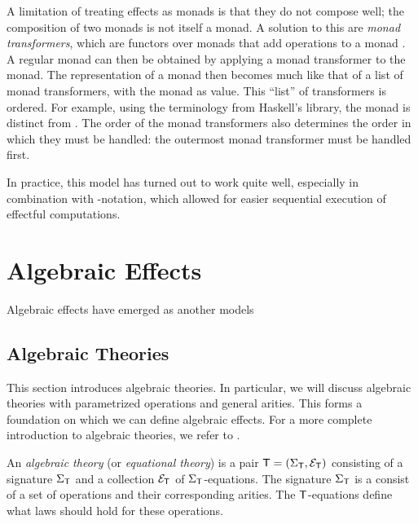 A limitation of treating effects as monads is that they do not compose well; the composition of two monads is not itself a monad. A solution to this are \emph{monad transformers}, which are functors over monads that add operations to a monad \autocite{moggi_abstract_1989}. A regular monad can then be obtained by applying a monad transformer to the  monad. The representation of a monad then becomes much like that of a list of monad transformers, with the  monad as  value. This ``list'' of transformers is ordered. For example, using the terminology from Haskell's  library, the monad  is distinct from . The order of the monad transformers also determines the order in which they must be handled: the outermost monad transformer must be handled first.

In practice, this model has turned out to work quite well, especially in combination with -notation, which allowed for easier sequential execution of effectful computations.

\section{Algebraic Effects}\label{sec:alg}


Algebraic effects have emerged as another models 

\subsection{Algebraic Theories}

This section introduces algebraic theories. In particular, we will discuss algebraic theories with parametrized operations and general arities. This forms a foundation on which we can define algebraic effects. For a more complete introduction to algebraic theories, we refer to \textcite{bauer_what_2018}.

\begin{definition}
    An \emph{algebraic theory} (or \emph{equational theory}) is a pair $\mathsf{T} = (\Sigma_\mathsf{T}, \mathcal{E}_\mathsf{T})$ consisting of a signature $\Sigma_\mathsf{T}$ and a collection $\mathcal{E}_\mathsf{T}$ of $\Sigma_\mathsf{T}$-equations. The signature $\Sigma_\mathsf{T}$ is a consist of a set of operations and their corresponding arities. The $\mathsf{T}$-equations define what laws should hold for these operations.
\end{definition}

